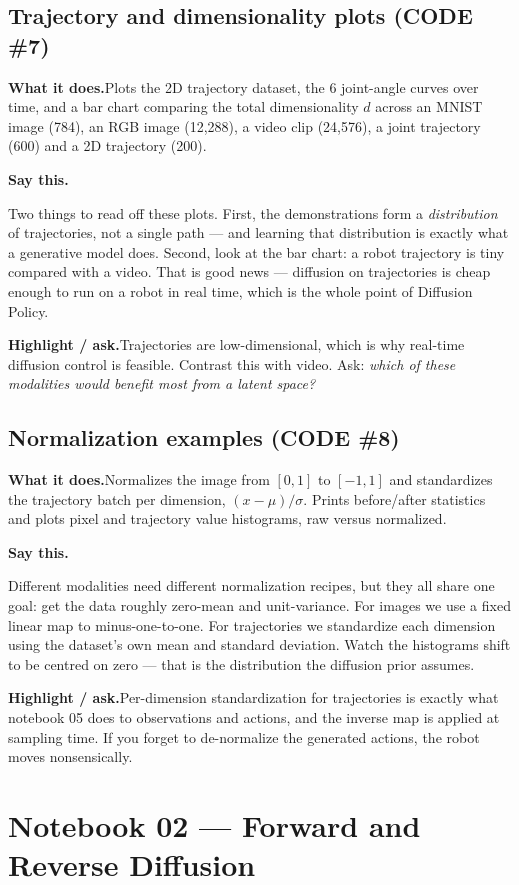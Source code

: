 \documentclass[11pt]{article}
\newenvironment{saythis}{%
  \par\smallskip\noindent
  \begin{list}{}{%
    \setlength{\leftmargin}{1.2em}%
    \setlength{\rightmargin}{0.5em}%
    \setlength{\topsep}{2pt}%
  }\item\relax
  \color{sayrule}\textbf{Say this.}\hspace{0.4em}\color{black}\itshape
}{%
  \end{list}\par\smallskip
}
\newcommand{\highlight}[1]{\par\smallskip\noindent\textcolor{hlcolor}{\textbf{Highlight / ask.}}\hspace{0.4em}#1\par\smallskip}
\newcommand{\whatdoes}[1]{\par\noindent\textbf{What it does.}\hspace{0.4em}#1\par}
\begin{document}
\subsection{Trajectory and dimensionality plots (CODE \#7)}
\whatdoes{Plots the 2D trajectory dataset, the 6 joint-angle curves over time, and a bar chart comparing
the total dimensionality $d$ across an MNIST image (784), an RGB image (12{,}288), a video clip (24{,}576),
a joint trajectory (600) and a 2D trajectory (200).}
\begin{saythis}
Two things to read off these plots. First, the demonstrations form a \emph{distribution} of
trajectories, not a single path --- and learning that distribution is exactly what a generative model
does. Second, look at the bar chart: a robot trajectory is tiny compared with a video. That is good
news --- diffusion on trajectories is cheap enough to run on a robot in real time, which is the whole
point of Diffusion Policy.
\end{saythis}
\highlight{Trajectories are low-dimensional, which is why real-time diffusion control is feasible.
Contrast this with video. Ask: \emph{which of these modalities would benefit most from a latent space?}}

\subsection{Normalization examples (CODE \#8)}
\whatdoes{Normalizes the image from $[0,1]$ to $[-1,1]$ and standardizes the trajectory batch per
dimension, $(x-\mu)/\sigma$. Prints before/after statistics and plots pixel and trajectory value
histograms, raw versus normalized.}
\begin{saythis}
Different modalities need different normalization recipes, but they all share one goal: get the data
roughly zero-mean and unit-variance. For images we use a fixed linear map to minus-one-to-one. For
trajectories we standardize each dimension using the dataset's own mean and standard deviation. Watch
the histograms shift to be centred on zero --- that is the distribution the diffusion prior assumes.
\end{saythis}
\highlight{Per-dimension standardization for trajectories is exactly what notebook 05 does to
observations and actions, and the inverse map is applied at sampling time. If you forget to
de-normalize the generated actions, the robot moves nonsensically.}

\section{Notebook 02 --- Forward and Reverse Diffusion}
\end{document}
